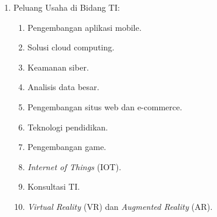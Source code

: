 \begin{enumerate}
\begin{enumerate}
  \end{enumerate}
\item Peluang Usaha di Bidang TI:
  \begin{enumerate}
  \item Pengembangan aplikasi mobile.
  \item Solusi cloud computing.
  \item Keamanan siber.
  \item Analisis data besar.
  \item Pengembangan situs web dan e-commerce.
  \item Teknologi pendidikan.
  \item Pengembangan game.
  \item \textit{Internet of Things} (IOT).
  \item Konsultasi TI.
  \item \textit{Virtual Reality} (VR) dan \textit{Augmented Reality} (AR).
  \end{enumerate}
\end{enumerate}
